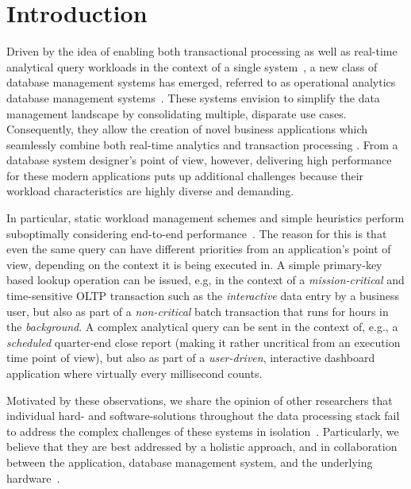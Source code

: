 \documentclass[11pt]{article}
\begin{document}
\section{Introduction}
Driven by the idea of enabling both transactional processing as well as real-time analytical query workloads in the context of a single system~\cite{nollhrm19:Plattner:2009:ACA}, a new class of database management systems has emerged, referred to as operational analytics database management systems~\cite{nollhrm19:Boehm:2016:OAD}.
These systems envision to simplify the data management landscape by consolidating multiple, disparate use cases.
Consequently, they allow the creation of novel business applications which seamlessly combine both real-time analytics and transaction processing \cite{nollhrm19:Leukert:2015:TIR}.
From a database system designer's point of view, however, delivering high performance for these modern applications puts up additional challenges because their workload characteristics are highly diverse and demanding.

In particular, static workload management schemes and simple heuristics perform suboptimally considering end-to-end performance~\cite{nollhrm19:Wolf:2014:SUM}.
The reason for this is that even the same query can have different priorities from an application's point of view, depending on the context it is being executed in.
A simple primary-key based lookup operation can be issued, e.g, in the context of a \emph{mission-critical} and time-sensitive OLTP transaction such as the \emph{interactive} data entry by a business user, but also as part of a \emph{non-critical} batch transaction that runs for hours in the \emph{background}.
A complex analytical query can be sent in the context of, e.g., a \emph{scheduled} quarter-end close report (making it rather uncritical from an execution time point of view), but also as part of a \emph{user-driven}, interactive dashboard application where virtually every millisecond counts.

Motivated by these observations, we share the opinion of other researchers that individual hard- and software-solutions throughout the data processing stack fail to address the complex challenges of these systems in isolation~\cite{nollhrm19:Giceva:2013:COD, nollhrm19:Giceva:2017:COS}.
Particularly, we believe that they are best addressed by a holistic approach, and in collaboration between the application, database management system, and the underlying hardware~\cite{nollhrm19:Boehm:2015:NOT}.
\end{document}
